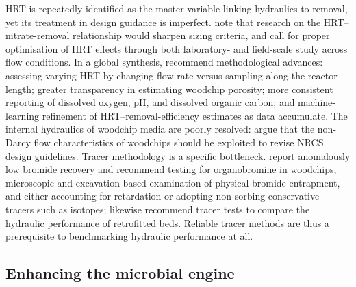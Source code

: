 HRT is repeatedly identified as the master variable linking hydraulics to
removal, yet its treatment in design guidance is imperfect. \textcite{Moorman2015}
note that research on the HRT--nitrate-removal relationship would sharpen sizing
criteria, and \textcite{Povilaitis2018} call for proper optimisation of HRT
effects through both laboratory- and field-scale study across flow conditions. In
a global synthesis, \textcite{Christianson2025c} recommend methodological
advances: assessing varying HRT by changing flow rate versus sampling along the
reactor length; greater transparency in estimating woodchip porosity; more
consistent reporting of dissolved oxygen, pH, and dissolved organic carbon; and
machine-learning refinement of HRT--removal-efficiency estimates as data
accumulate. The internal hydraulics of woodchip media are poorly resolved:
\textcite{Ghane2016} argue that the non-Darcy flow characteristics of woodchips
should be exploited to revise NRCS design guidelines. Tracer methodology is a
specific bottleneck. \textcite{Ghane2019b} report anomalously low bromide
recovery and recommend testing for organobromine in woodchips, microscopic and
excavation-based examination of physical bromide entrapment, and either
accounting for retardation or adopting non-sorbing conservative tracers such as
isotopes; \textcite{Ghane2018} likewise recommend tracer tests to compare the
hydraulic performance of retrofitted beds. Reliable tracer methods are thus a
prerequisite to benchmarking hydraulic performance at all.

\subsection{Enhancing the microbial engine}

